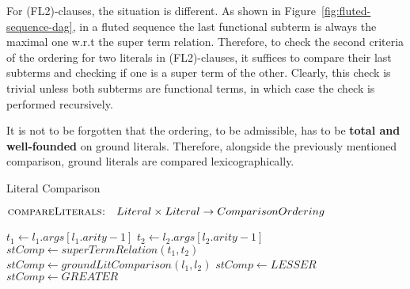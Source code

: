 For (FL2)-clauses, the situation is different. As shown in Figure~\ref{fig:fluted-sequence-dag}, in a fluted sequence the last functional subterm is always the maximal one w.r.t the super term relation.
Therefore, to check the second criteria of the ordering for two literals in (FL2)-clauses, it suffices to compare their last subterms and checking if one is a super term of the other.
Clearly, this check is trivial unless both subterms are functional terms, in which case the check is performed recursively.

It is not to be forgotten that the ordering, to be admissible, has to be \textbf{total and well-founded} on ground literals.
Therefore, alongside the previously mentioned comparison, ground literals are compared lexicographically.

\begin{algorithm}[H]
  \caption{Literal Comparison}\label{alg:literal-comparison}
  \begin{algorithmic}[1]
    \Statex{}  \(\textsc{compareLiterals:}\quad Literal \times Literal \to ComparisonOrdering\)
        \State{} 
      \EndIf{}

          \State{} 
        \Else{}
          \State{} 
        \EndIf{}
      \EndIf{}
      \State{} \(t_1 \gets l_1.args[l_1.arity - 1]\)
      \State{} \(t_2 \gets l_2.args[l_2.arity - 1]\)
            \State{} 
          \Else{}
            \State{} 
          \EndIf{}
        \EndIf{}
        \State{} 
      \EndIf{}
          \State{} 
        \Else{}
          \State{} 
        \EndIf{}
      \EndIf{}
      \State{} \(stComp \gets superTermRelation(t_1,t_2)\)
          \State{} \(stComp\gets groundLitComparison(l_1,l_2)\)
          \State{} \(stComp \gets LESSER\)
        \Else{}
          \State{} \(stComp \gets GREATER\)
        \EndIf{}
      \EndIf{}
        \State{} 
      \EndIf{}
          \State{} 
        \Else{}
          \State{} 
        \EndIf{}
      \Else{}
        \State{} 
      \EndIf{}
    \EndFunction{}
  \end{algorithmic}
\end{algorithm}